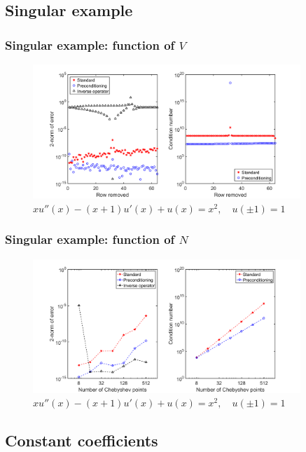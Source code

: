 \documentclass[handout]{beamer}
\begin{document}
\subsection{Singular example}

\begin{frame}
\frametitle{Singular example: function of $V$}
\begin{figure}
\includegraphics[width=0.9\textwidth]{example_SingCoeffs_02.png}
\caption{$x u''(x) - (x+1) u'(x) + u(x) = x^2, \quad u(\pm 1) = 1$}
\end{figure}
\end{frame}

\begin{frame}
\frametitle{Singular example: function of $N$}
\begin{figure}
\includegraphics[width=0.9\textwidth]{example_SingCoeffs_03.png}
\caption{$x u''(x) - (x+1) u'(x) + u(x) = x^2, \quad u(\pm 1) = 1$}
\end{figure}
\end{frame}

\subsection{Constant coefficients}
\end{document}
